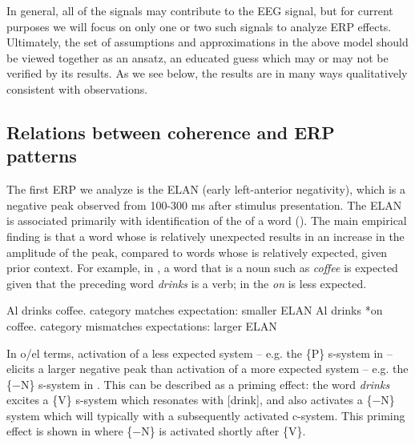 In general, all of the  signals may contribute to the EEG signal, but for current purposes we will focus on only one or two such signals to analyze ERP effects. Ultimately, the set of assumptions and approximations in the above model should be viewed together as an ansatz, an educated guess which may or may not be verified by its results. As we see below, the results are in many ways qualitatively consistent with observations.

\subsection{Relations between coherence and ERP patterns}

The first ERP we analyze is the ELAN (early left-anterior negativity), which is a negative peak observed from 100-300 ms after stimulus presentation. The ELAN is associated primarily with identification of the  of a word (\citealt{Friederici2002,HahneFriederici1999,SteinhauerDrury2012}). The main empirical finding is that a word whose  is relatively unexpected results in an increase in the amplitude of the peak, compared to words whose  is relatively expected, given prior context. For example, in , a word that is a noun such as \textit{coffee} is expected given that the preceding word \textit{drinks} is a  verb; in  the  \textit{on} is less expected.

\ea\label{ex:6:23}
\ea\label{ex:6:23a} Al drinks coffee. \break category matches expectation: smaller ELAN
\ex\label{ex:6:23b} Al drinks *on coffee. \break category mismatches expectations: larger ELAN
\z
\z

In o/el terms, activation of a less expected system -- e.g. the \{P\} s-sys\-tem in  -- elicits a larger negative peak than activation of a more expected system -- e.g. the \{−N\} s-sys\-tem in . This can be described as a priming effect: the word \textit{drinks} excites a \{V\} s-sys\-tem which resonates with [drink], and also activates a \{−N\} system which will typically  with a subsequently activated c-sys\-tem. This priming effect is shown in {} where \{−N\} is activated shortly after \{V\}. 


